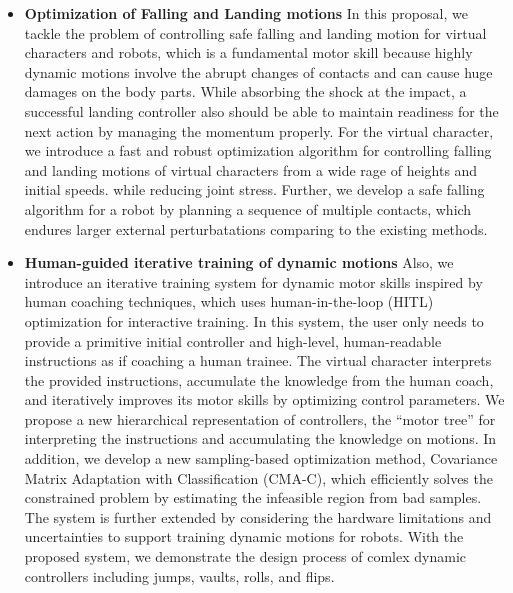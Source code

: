 \begin{itemize}
\item 
  \textbf{Optimization of Falling and Landing motions}
  In this proposal, we tackle the problem of controlling safe falling 
  and landing motion for virtual characters and robots, which is a fundamental
  motor skill because highly dynamic motions involve the abrupt changes
  of contacts and can cause huge damages on the body parts.
  While absorbing the shock at the impact, a successful landing controller 
  also should be able to maintain readiness for the next action by managing
  the momentum properly.
  For the virtual character, we introduce a fast and robust optimization 
  algorithm for controlling falling and landing motions of virtual
  characters from a wide rage of heights and initial speeds.
  while reducing joint stress.
  Further, we develop a safe falling algorithm for a robot by planning a sequence of
  multiple contacts, which endures larger external perturbatations comparing to
  the existing methods.

\item 
  \textbf{Human-guided iterative training of dynamic motions}
  Also, we introduce an iterative training system for dynamic motor skills
  inspired by human coaching techniques, which uses human-in-the-loop
  (HITL) optimization for interactive training.
  In this system, the user only needs to provide a primitive initial controller
  and high-level, human-readable instructions as if coaching a human trainee.
  The virtual character interprets the provided instructions,
  accumulate the knowledge from the human coach,
  and iteratively improves its motor skills by optimizing control parameters.
  We propose a new hierarchical representation of controllers, 
  the ``motor tree'' for interpreting the instructions and accumulating
  the knowledge on motions.
  In addition, we develop a new sampling-based optimization method,
  Covariance Matrix Adaptation with Classification (CMA-C), 
  which efficiently solves the constrained problem by estimating
  the infeasible region from bad samples.
  The system is further extended by considering the hardware limitations 
  and uncertainties to support training dynamic motions for robots.
  With the proposed system, we demonstrate the design process of
  comlex dynamic controllers including jumps, vaults, rolls, and flips.



\end{itemize}

